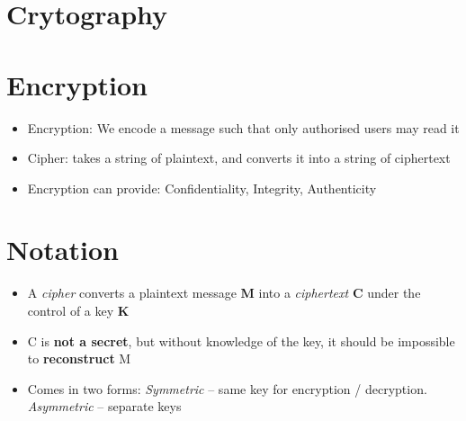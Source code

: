 \documentclass{article}
\begin{document}
\tableofcontents

\newpage

\section{Crytography}

\section{Encryption}
\begin{itemize}
  \item Encryption: We encode a message such that only authorised users may read it
  \item Cipher: takes a string of plaintext, and converts it into a string of ciphertext
  \item Encryption can provide: Confidentiality, Integrity, Authenticity
\end{itemize}

\section{Notation}
\begin{itemize}
  \item A \textit{cipher} converts a plaintext message \textbf{M} into a \textit{ciphertext} \textbf{C} under the control of a key \textbf{K} 
  \item C is \textbf{not a secret}, but without knowledge of the key, it should be impossible to \textbf{reconstruct} M
  \item Comes in two forms: \textit{Symmetric} – same key for encryption / decryption. \textit{Asymmetric} – separate keys
\end{itemize}
\end{document}
